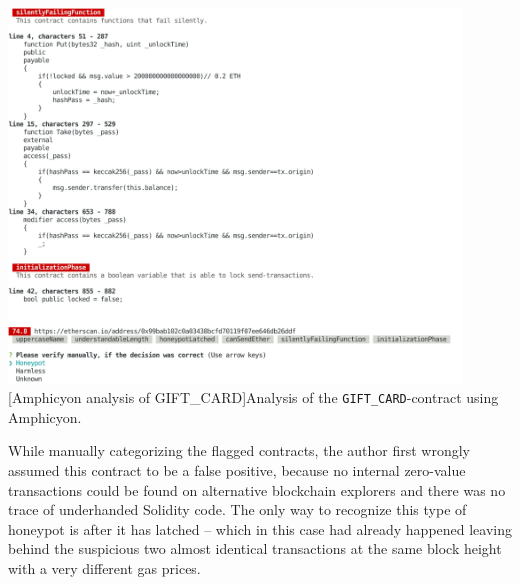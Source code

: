 \vspace{1em}
\begin{minipage}{\linewidth}
	\centering
	\includegraphics[width=12cm]{img/giftcard/analysis.pdf}
	[Amphicyon analysis of GIFT_CARD]{Analysis of the \texttt{GIFT_CARD}-contract using Amphicyon.}
	\label{figure:appendix:giftcard:amphicyon}
\end{minipage}

While manually categorizing the flagged contracts, the author first wrongly assumed this contract to be a false positive, because no internal zero-value transactions could be found on alternative blockchain explorers and there was no trace of underhanded Solidity code. The only way to recognize this type of honeypot is after it has latched -- which in this case had already happened leaving behind the suspicious two almost identical transactions at the same block height with a very different gas prices.

\pagebreak{}
